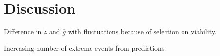\label{sec:Disc}
\section*{Discussion}

Difference in $\overline{z}$ and $\overline{g}$ with fluctuations because of selection on viability.

Increasing number of extreme events from predictions.
